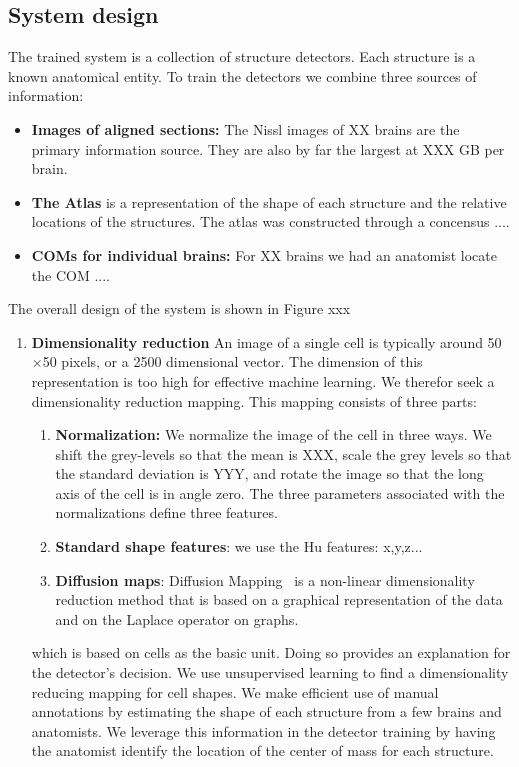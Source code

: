 \documentclass[runningheads]{llncs}
\begin{document}
\subsection{System design}

The trained system is a collection of structure detectors. Each structure is a known anatomical entity. To train the detectors we combine three sources of information:
\begin{itemize}
    \item {\bf Images of aligned sections:} The Nissl images of XX brains are the primary information source. They are also by far the largest at XXX GB per brain.
    \item {\bf The Atlas} is a representation of the shape of each structure and the relative locations of the structures. The atlas was constructed through a concensus ....
    \item {\bf COMs for individual brains:} For XX brains we had an anatomist locate the COM ....
\end{itemize}

The overall design of the system is shown in Figure xxx
\begin{enumerate}
\item{\bf Dimensionality reduction}
An image of a single cell is typically around 50$\times$50 pixels, or a 2500 dimensional vector. The dimension of this representation is too high for effective machine learning. We therefor seek a dimensionality reduction mapping. This mapping consists of three parts:
\begin{enumerate}
    \item {\bf Normalization:} We normalize the image of the cell in three ways. We 
    shift the grey-levels so that the mean is XXX, scale the grey levels so that the standard deviation is YYY, and rotate the image so that the long axis of the cell is in angle zero. The three parameters associated with the normalizations define three features.
    \item {\bf Standard shape features}: we use the Hu features: x,y,z...
    \item{ \bf  Diffusion maps}: Diffusion Mapping~\cite{Belkin, Coifman} is a non-linear dimensionality reduction method that is based on a graphical representation of the data and on the Laplace operator on graphs. 
\end{enumerate}

which is based on cells as the basic unit. Doing so provides an explanation for the detector's decision. We use unsupervised learning to find a dimensionality reducing mapping for cell shapes. We make efficient use of manual annotations by estimating the shape of each structure from a few brains and anatomists. We leverage this information in the detector training by having the anatomist identify the location of the center of mass for each structure.
\end{enumerate}
\end{document}
